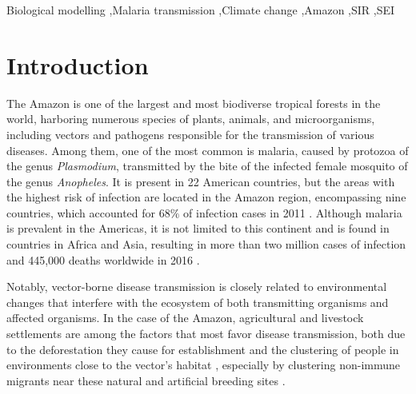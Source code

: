 \documentclass[a4paper,fleqn]{cas-dc}
\begin{document}





\begin{keywords}
Biological modelling \sep Malaria transmission \sep Climate change \sep Amazon \sep SIR \sep SEI
\end{keywords}


\maketitle

\section{Introduction}

The Amazon is one of the largest and most biodiverse tropical forests 
in the world, harboring numerous species of plants, animals, and 
microorganisms, including vectors and pathogens responsible for the 
transmission of various diseases. Among them, one of the most common 
is malaria, caused by protozoa of the genus \textit{Plasmodium}, 
transmitted by the bite of the infected female mosquito of the genus 
\textit{Anopheles}. It is present in 22 American countries, but the 
areas with the highest risk of infection are located in the Amazon 
region, encompassing nine countries, which accounted for $68\%$ of 
infection cases in 
2011 \cite{pimenta_orfano_bahia_duarte_rios-velasquez_melo_pessoa_oliveira_campos_villegas_etal_2015}. 
Although malaria is prevalent in the Americas, it is 
not limited to this continent and is found in countries in Africa and Asia, 
resulting in more than two million cases of infection and 445,000 deaths 
worldwide in 2016 \cite{regulation_of_sexual_commitment}.

Notably, vector-borne disease transmission is closely related to 
environmental changes that interfere with the ecosystem of both 
transmitting organisms and affected organisms. In the case of the 
Amazon, agricultural and livestock settlements are among the factors
that most favor disease transmission, both due to the deforestation 
they cause for establishment and the clustering of people in environments 
close to the vector's habitat \cite{silva-nunes_malaria_amazon_2008}, 
especially by clustering non-immune migrants near these natural and 
artificial breeding sites \cite{DASILVANUNES2012281}.
\end{document}
